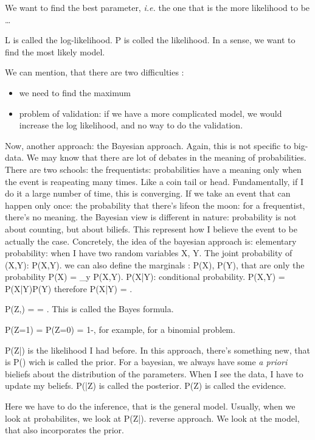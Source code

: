 \documentclass[a4paper]{tufte-book}
\newcommand{\hairsp}{\hspace{1pt}}%
\newcommand{\ie}{\textit{i.\hairsp{}e.}\xspace}
\begin{document}
We want to find the best parameter, \ie the one that is the more likelihood to be \ldots

L is called the log-likelihood. P is colled the likelihood.
In a sense, we want to find the most likely model.

We can mention, that there are two difficulties :
\begin{itemize}
    \item we need to find the maximum
    \item problem of validation: if we have a more complicated model, we would increase the log likelihood, and no way to do the validation.
\end{itemize}

Now, another approach: the Bayesian approach. Again, this is not specific to big-data.
We may know that there are lot of debates in the meaning of probabilities. There
are two schools: the frequentists: probabilities have a meaning only when the
event is reapeating many times. Like a coin tail or head. Fundamentally, if I do
it a large number of time, this is converging.
If we take an event that can happen only once: the probability that there's lifeon the moon: for a frequentist, there's no meaning.
the Bayesian view is different in nature: probability is not about counting, but
about biliefs. This represent how I believe the event to be actually the case.
Concretely, the idea of the bayesian approach is:
elementary probability: when I have two random variables X, Y.
The joint probability of (X,Y): P(X,Y). we can also define the marginals :
P(X), P(Y), that are only the probability P(X) = \sum_y P(X,Y).
P(X|Y): conditional probability.
P(X,Y) = P(X|Y)P(Y)
therefore P(X|Y) = .


P(Z,\theta) =  = .
This is called the Bayes formula.

P(Z=1) = \theta
P(Z=0) = 1-\theta, for example, for a binomial problem.

P(Z|\theta) is the likelihood I had before.
In this approach, there's something new, that is P(\theta) wich is called the prior.
For a bayesian, we always have some \emph{a priori} bieliefs about the
distribution of the parameters. When I see the data, I have to update my
beliefs.
P(\theta|Z) is called the posterior.
P(Z) is called the evidence.

Here we have to do the inference, that is the general model. Usually, when we
look at probabilites, we look at P(Z|\theta). reverse approach.
We look at  the model, that also incorporates the prior.
\end{document}

